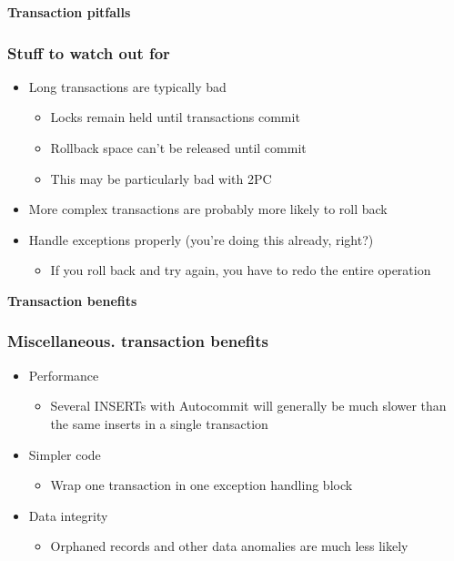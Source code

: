 \documentclass[svgnames]{beamer}
\begin{document}
\begin{frame}
    \begin{centering}
\textbf{Transaction pitfalls}
    \par
    \end{centering}
\end{frame}

\begin{frame}
    \frametitle{Stuff to watch out for}
    \begin{itemize}
        \item Long transactions are typically bad
        \begin{itemize}
            \item Locks remain held until transactions commit
            \item Rollback space can't be released until commit
            \item This may be particularly bad with 2PC
        \end{itemize}
        \item More complex transactions are probably more likely to roll back
        \item Handle exceptions properly (you're doing this already, right?)
        \begin{itemize}
            \item If you roll back and try again, you have to redo the entire operation
        \end{itemize}
    \end{itemize}
\end{frame}

\begin{frame}
    \begin{centering}
\textbf{Transaction benefits}
    \par
    \end{centering}
\end{frame}

\begin{frame}
    \frametitle{Miscellaneous. transaction benefits}
    \begin{itemize}
        \item Performance
        \begin{itemize}
            \item Several INSERTs with Auto\textendash commit will generally be
            much slower than the same inserts in a single transaction
        \end{itemize}
        \item Simpler code
        \begin{itemize}
            \item Wrap one transaction in one exception handling block
        \end{itemize}
        \item Data integrity
        \begin{itemize}
            \item Orphaned records and other data anomalies are much less likely
        \end{itemize}
    \end{itemize}
\end{frame}
\end{document}
